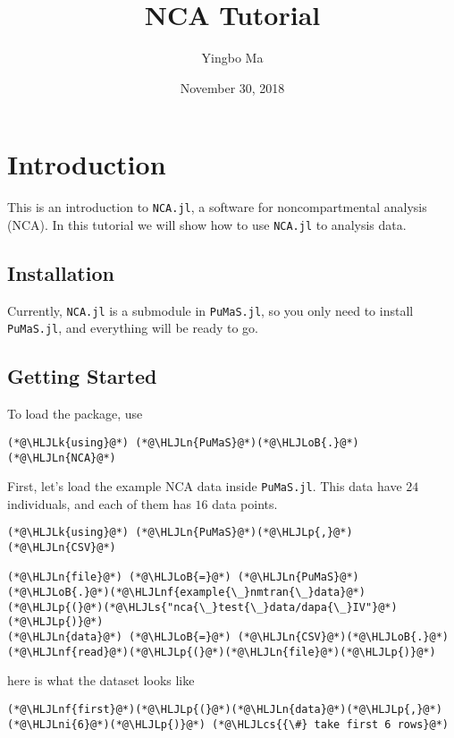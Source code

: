 \documentclass[12pt,a4paper]{article}
\title{ NCA Tutorial }
\author{ Yingbo Ma }
\date{ November 30, 2018 }
\newcommand{\HLJLk}[1]{\textcolor[RGB]{148,91,176}{\textbf{#1}}}
\newcommand{\HLJLn}[1]{#1}
\newcommand{\HLJLnf}[1]{\textcolor[RGB]{66,102,213}{#1}}
\newcommand{\HLJLs}[1]{\textcolor[RGB]{201,61,57}{#1}}
\newcommand{\HLJLni}[1]{\textcolor[RGB]{59,151,46}{#1}}
\newcommand{\HLJLoB}[1]{\textcolor[RGB]{102,102,102}{\textbf{#1}}}
\newcommand{\HLJLp}[1]{#1}
\newcommand{\HLJLcs}[1]{\textcolor[RGB]{153,153,119}{\textit{#1}}}
\begin{document}
\maketitle

\section{Introduction}
This is an introduction to \texttt{NCA.jl}, a software for noncompartmental analysis (NCA). In this tutorial we will show how to use \texttt{NCA.jl} to analysis data.

\subsection{Installation}
Currently, \texttt{NCA.jl} is a submodule in \texttt{PuMaS.jl}, so you only need to install \texttt{PuMaS.jl}, and everything will be ready to go.

\subsection{Getting Started}
To load the package, use


\begin{lstlisting}
(*@\HLJLk{using}@*) (*@\HLJLn{PuMaS}@*)(*@\HLJLoB{.}@*)(*@\HLJLn{NCA}@*)
\end{lstlisting}


First, let's load the example NCA data inside \texttt{PuMaS.jl}. This data have $24$ individuals, and each of them has $16$ data points.


\begin{lstlisting}
(*@\HLJLk{using}@*) (*@\HLJLn{PuMaS}@*)(*@\HLJLp{,}@*) (*@\HLJLn{CSV}@*)

(*@\HLJLn{file}@*) (*@\HLJLoB{=}@*) (*@\HLJLn{PuMaS}@*)(*@\HLJLoB{.}@*)(*@\HLJLnf{example{\_}nmtran{\_}data}@*)(*@\HLJLp{(}@*)(*@\HLJLs{"nca{\_}test{\_}data/dapa{\_}IV"}@*)(*@\HLJLp{)}@*)
(*@\HLJLn{data}@*) (*@\HLJLoB{=}@*) (*@\HLJLn{CSV}@*)(*@\HLJLoB{.}@*)(*@\HLJLnf{read}@*)(*@\HLJLp{(}@*)(*@\HLJLn{file}@*)(*@\HLJLp{)}@*)
\end{lstlisting}


here is what the dataset looks like


\begin{lstlisting}
(*@\HLJLnf{first}@*)(*@\HLJLp{(}@*)(*@\HLJLn{data}@*)(*@\HLJLp{,}@*) (*@\HLJLni{6}@*)(*@\HLJLp{)}@*) (*@\HLJLcs{{\#} take first 6 rows}@*)
\end{lstlisting}
\end{document}
